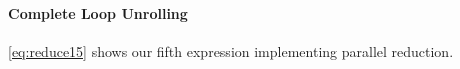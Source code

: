 \paragraph{Complete Loop Unrolling}
\autoref{eq:reduce15} shows our fifth expression implementing parallel reduction.
